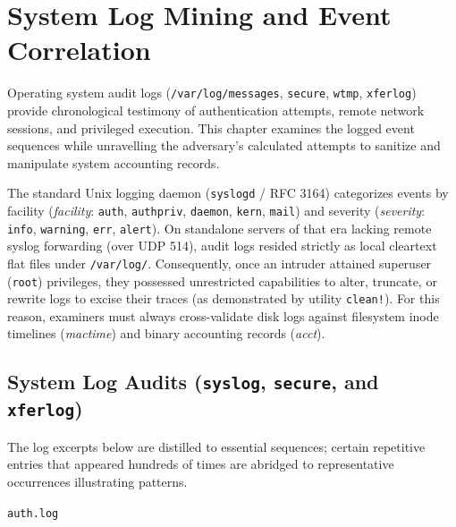 \chapter{System Log Mining and Event Correlation}

Operating system audit logs (\texttt{/var/log/messages}, \texttt{secure}, \texttt{wtmp}, \texttt{xferlog}) provide chronological testimony of authentication attempts, remote network sessions, and privileged execution. This chapter examines the logged event sequences while unravelling the adversary's calculated attempts to sanitize and manipulate system accounting records.

\begin{notaforense}
The standard Unix logging daemon (\texttt{syslogd} / RFC 3164) categorizes events by facility (\textit{facility}: \texttt{auth}, \texttt{authpriv}, \texttt{daemon}, \texttt{kern}, \texttt{mail}) and severity (\textit{severity}: \texttt{info}, \texttt{warning}, \texttt{err}, \texttt{alert}). On standalone servers of that era lacking remote syslog forwarding (over UDP 514), audit logs resided strictly as local cleartext flat files under \texttt{/var/log/}. Consequently, once an intruder attained superuser (\texttt{root}) privileges, they possessed unrestricted capabilities to alter, truncate, or rewrite logs to excise their traces (as demonstrated by utility \texttt{clean!}). For this reason, examiners must always cross-validate disk logs against filesystem inode timelines (\textit{mactime}) and binary accounting records (\textit{acct}).
\end{notaforense}

\section{System Log Audits (\texttt{syslog}, \texttt{secure}, and \texttt{xferlog})}

The log excerpts below are distilled to essential sequences; certain repetitive entries that appeared hundreds of times are abridged to representative occurrences illustrating patterns.

\texttt{auth.log}

\vspace{1em}

